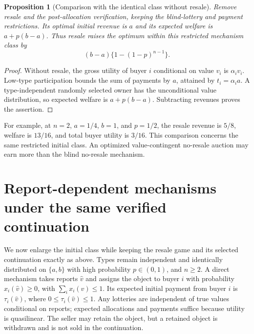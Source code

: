 \documentclass[11pt]{article}
\newtheorem{proposition}[theorem]{Proposition}
\theoremstyle{definition}
\theoremstyle{remark}
\begin{document}
\begin{proposition}[Comparison with the identical class without resale]
Remove resale and the post-allocation verification, keeping the blind-lottery and payment restrictions. Its optimal initial revenue is $a$ and its expected welfare is $a+p(b-a)$. Thus resale raises the optimum within this restricted mechanism class by
\[
 (b-a)\{1-(1-p)^{n-1}\}.
\]
\end{proposition}
\begin{proof}
Without resale, the gross utility of buyer $i$ conditional on value $v_i$ is $\alpha_i v_i$. Low-type participation bounds the sum of payments by $a$, attained by $t_i=\alpha_i a$. A type-independent randomly selected owner has the unconditional value distribution, so expected welfare is $a+p(b-a)$. Subtracting revenues proves the assertion.
\end{proof}

For example, at $n=2$, $a=1/4$, $b=1$, and $p=1/2$, the resale revenue is $5/8$, welfare is $13/16$, and total buyer utility is $3/16$. This comparison concerns the same restricted initial class. An optimized value-contingent no-resale auction may earn more than the blind no-resale mechanism.


\section{Report-dependent mechanisms under the same verified continuation}
We now enlarge the initial class while keeping the resale game and its
selected continuation exactly as above. Types remain independent and
identically distributed on $\{a,b\}$ with high probability $p\in(0,1)$,
and $n\geq2$. A direct mechanism takes reports $\hat v$ and assigns the
object to buyer $i$ with probability $x_i(\hat v)\geq0$, with
$\sum_i x_i(\hat v)\leq1$. Its expected initial payment from buyer $i$
is $\tau_i(\hat v)$, where $0\leq\tau_i(\hat v)\leq1$.
Any lotteries are independent of true values conditional on reports;
expected allocations and payments suffice because utility is
quasilinear. The seller may retain the object, but a retained object
is withdrawn and is not sold in the continuation.
\end{document}
